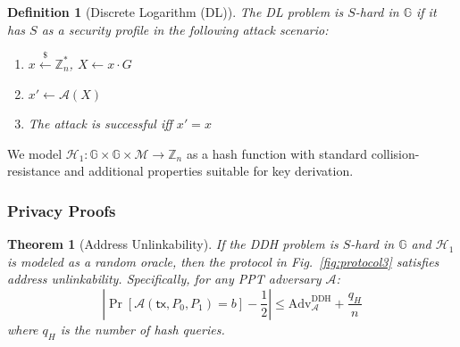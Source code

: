 \documentclass{article}
\newtheorem{definition}{Definition}[section]
\newtheorem{theorem}{Theorem}[section]
\begin{document}
\begin{definition}[Discrete Logarithm (DL)]
The DL problem is $S$-hard in $\mathbb{G}$ if it has $S$ as a security profile in the following attack scenario:
\begin{enumerate}
\item $x \stackrel{\$}{\leftarrow} \mathbb{Z}_n^*$, $X \leftarrow x \cdot G$
\item $x' \gets \mathcal{A}(X)$
\item The attack is successful iff $x' = x$
\end{enumerate}
\end{definition}

We model $\mathcal{H}_1 \colon \mathbb{G} \times \mathbb{G} \times \mathcal{M} \to \mathbb{Z}_n$ as a hash function with standard collision-resistance and additional properties suitable for key derivation.

\subsubsection{Privacy Proofs}

\begin{theorem}[Address Unlinkability]
\label{thm:address-unlinkability}
If the DDH problem is $S$-hard in $\mathbb{G}$ and $\mathcal{H}_1$ is modeled as a random oracle, then the protocol in Fig.~\ref{fig:protocol3} satisfies address unlinkability. Specifically, for any PPT adversary $\mathcal{A}$:
$$\left|\Pr\left[\mathcal{A}(\mathsf{tx}, P_0, P_1) = b\right] - \frac{1}{2}\right| \leq \text{Adv}^{\text{DDH}}_{\mathcal{A}} + \frac{q_H}{n}$$
where $q_H$ is the number of hash queries.
\end{theorem}
\end{document}
